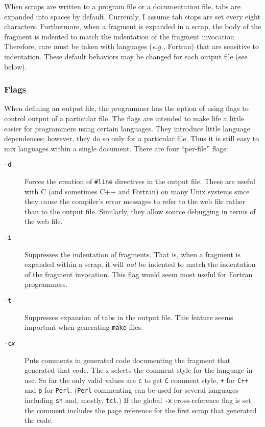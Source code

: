 \documentclass[a4paper]{report}
\begin{document}
When scraps are written to a program file or a documentation file, tabs are
expanded into spaces by default. Currently, I assume tab stops are set
every eight characters. Furthermore, when a fragment is expanded in a scrap,
the body of the fragment is indented to match the indentation of the
fragment invocation. Therefore, care must be taken with languages
({\em e.g.,} Fortran) that are sensitive to indentation.
These default behaviors may be changed for each output file (see
below).

\subsubsection{Flags}

When defining an output file, the programmer has the option of using
flags to control output of a particular file. The flags are intended
to make life a little easier for programmers using certain languages.
They introduce little language dependences; however, they do so only
for a particular file. Thus it is still easy to mix languages within a
single document. There are four ``per-file'' flags:
\begin{description}
\item[\tt -d] Forces the creation of \verb|#line| directives in the
  output file. These are useful with C (and sometimes C++ and Fortran) on
  many Unix systems since they cause the compiler's error messages to
  refer to the web file rather than to the output file. Similarly, they
  allow source debugging in terms of the web file.
\item[\tt -i] Suppresses the indentation of fragments. That is, when a
  fragment is expanded within a scrap, it will {\em not\/} be indented to
  match the indentation of the fragment invocation. This flag would seem
  most useful for Fortran programmers.
\item[\tt -t] Suppresses expansion of tabs in the output file. This
  feature seems important when generating \verb|make| files.
\item[\tt -c{\it x}] Puts comments in generated code documenting the
fragment that generated that code. The {\it x} selects the comment style
for the language in use. So far the only valid values are \verb|c| to get
\verb|C| comment style, \verb|+| for \verb|C++| and \verb|p| for
\verb|Perl|. (\verb|Perl| commenting can be used for several languages
including \verb|sh| and, mostly, \verb|tcl|.)
If the global \verb|-x| cross-reference flag is
set the comment includes the page reference for the first scrap that
generated the code.
\end{description}
\end{document}
